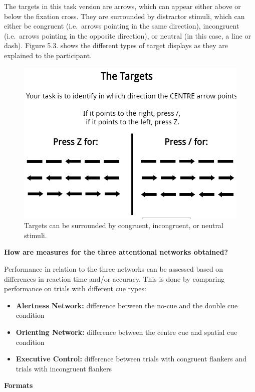 \documentclass[
]{book}
\providecommand{\tightlist}{%
  \setlength{\itemsep}{0pt}\setlength{\parskip}{0pt}}
\begin{document}
The targets in this task version are arrows, which can appear either above or below the fixation cross. They are surrounded by distractor stimuli, which can either be congruent (i.e.~arrows pointing in the same direction), incongruent (i.e.~arrows pointing in the opposite direction), or neutral (in this case, a line or dash). Figure 5.3. shows the different types of target displays as they are explained to the participant.

\begin{figure}

{\centering \includegraphics[width=0.8\linewidth]{images/ANT_Targets} 

}

\caption{Targets can be surrounded by congruent, incongruent, or neutral stimuli.}\label{fig:Figure3-3}
\end{figure}

\textbf{How are measures for the three attentional networks obtained?}

Performance in relation to the three networks can be assessed based on differences in reaction time and/or accuracy. This is done by comparing performance on trials with different cue types:

\begin{itemize}
\tightlist
\item
  \textbf{Alertness Network:} difference between the no-cue and the double cue condition
\item
  \textbf{Orienting Network:} difference between the centre cue and spatial cue condition
\item
  \textbf{Executive Control:} difference between trials with congruent flankers and trials with incongruent flankers
\end{itemize}

\textbf{Formats}
\end{document}
